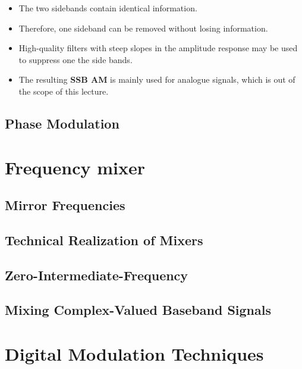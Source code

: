 \begin{refsection}
\begin{itemize}
	\item The two sidebands contain identical information.
	\item Therefore, one sideband can be removed without losing information.
	\item High-quality filters with steep slopes in the amplitude response may be used to suppress one the side bands.
	\item The resulting  \textbf{\ac{SSB} \ac{AM}} is mainly used for analogue signals, which is out of the scope of this lecture.
\end{itemize}

\subsection{Phase Modulation}


\section{Frequency mixer}



\subsection{Mirror Frequencies}

\subsection{Technical Realization of Mixers}



\subsection{Zero-Intermediate-Frequency}

\subsection{Mixing Complex-Valued Baseband Signals}


\section{Digital Modulation Techniques}


\end{refsection}
